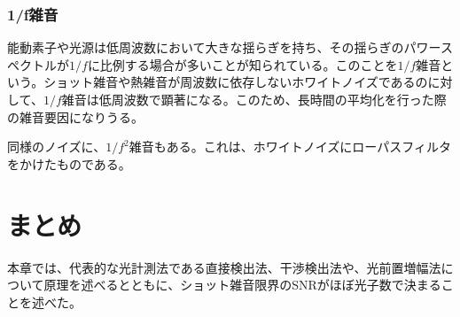 \subsubsection{1/f雑音}
能動素子や光源は低周波数において大きな揺らぎを持ち、その揺らぎのパワースペクトルが$1/f$に比例する場合が多いことが知られている。このことを$1/f$雑音という。ショット雑音や熱雑音が周波数に依存しないホワイトノイズであるのに対して、$1/f$雑音は低周波数で顕著になる。このため、長時間の平均化を行った際の雑音要因になりうる。

同様のノイズに、$1/f^2$雑音もある。これは、ホワイトノイズにローパスフィルタをかけたものである。

\section{まとめ}
本章では、代表的な光計測法である直接検出法、干渉検出法や、光前置増幅法について原理を述べるとともに、ショット雑音限界のSNRがほぼ光子数で決まることを述べた。

